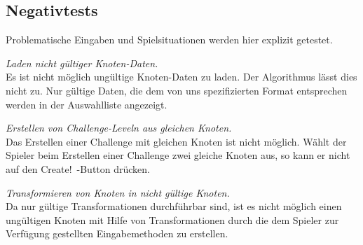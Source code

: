 %



\newpage



\label{Abschnitt:Tests:Protokoll:Negativ}



\subsection*{Negativtests}

Problematische Eingaben und Spielsituationen werden hier explizit getestet.\\



\begin{description}



\label{NT:10}

	\item[NT\_10] \textit{Laden nicht gültiger Knoten-Daten.} \hfill\\
	
	Es ist nicht möglich ungültige Knoten-Daten zu laden. Der Algorithmus lässt dies nicht zu. Nur gültige Daten, die dem von uns spezifizierten Format entsprechen werden in der Auswahlliste angezeigt.\\

	

\label{NT:20}
	
	\item[NT\_20] \textit{Erstellen von Challenge-Leveln aus gleichen Knoten.} \hfill\\
	
	Das Erstellen einer Challenge mit gleichen Knoten ist nicht möglich. Wählt der Spieler beim Erstellen einer Challenge zwei gleiche Knoten aus, so kann er nicht auf den \glqq Create!\grqq~-Button drücken.\\
	
	

\label{NT:30}

	\item[NT\_30] \textit{Transformieren von Knoten in nicht gültige Knoten.} \hfill\\
	
	Da nur gültige Transformationen durchführbar sind, ist es nicht möglich einen ungültigen Knoten mit Hilfe von Transformationen durch die dem Spieler zur Verfügung gestellten Eingabemethoden zu erstellen.\\
	


\end{description}
